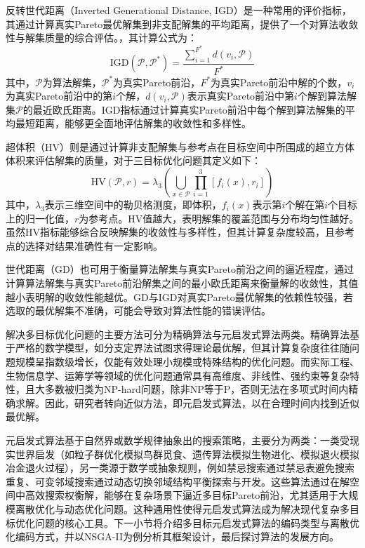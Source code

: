 反转世代距离（Inverted Generational Distance, IGD）是一种常用的评价指标，其通过计算真实Pareto最优解集到非支配解集的平均距离，提供了一个对算法收敛性与解集质量的综合评估。，其计算公式为：
\begin{equation}
    \text{IGD}(\mathcal{P}, \mathcal{P}^*) = \frac{\sum_{i=1}^{F^*} d(v_i, \mathcal{P})}{F^*}
\end{equation}
其中，\(\mathcal{P}\)为算法解集，\(\mathcal{P}^*\)为真实Pareto前沿，\(F^*\)为真实Pareto前沿中解的个数，\(v_i\)为真实Pareto前沿中的第\(i\)个解，\(d(v_i, \mathcal{P})\)表示真实Pareto前沿中第\(i\)个解到算法解集\(\mathcal{P}\)的最近欧氏距离。IGD指标通过计算真实Pareto前沿中每个解到算法解集的平均最短距离，能够更全面地评估解集的收敛性和多样性。

超体积（HV）则是通过计算非支配解集与参考点在目标空间中所围成的超立方体体积来评估解集的质量，对于三目标优化问题其定义如下：
\begin{equation}
    \text{HV}(\mathcal{P}, r) = \lambda_3 \left( \bigcup_{x\in \mathcal{P}} \prod_{i=1}^{3} [f_i(x), r_i] \right)
\end{equation}
其中，\(\lambda_3\)表示三维空间中的勒贝格测度，即体积，\(f_i(x)\)表示第\(i\)个解在第\(i\)个目标上的归一化值，\(r\)为参考点。HV值越大，表明解集的覆盖范围与分布均匀性越好。虽然HV指标能够综合反映解集的收敛性与多样性，但其计算复杂度较高，且参考点的选择对结果准确性有一定影响。

世代距离（GD）也可用于衡量算法解集与真实Pareto前沿之间的逼近程度，通过计算算法解集与真实Pareto前沿解集之间的最小欧氏距离来衡量解的收敛性，其值越小表明解的收敛性能越优。GD与IGD对真实Pareto最优解集的依赖性较强，若选取的最优解集不准确，可能会导致对算法性能的错误评估。

解决多目标优化问题的主要方法可分为精确算法与元启发式算法两类。精确算法基于严格的数学模型，如分支定界法试图求得理论最优解，但其计算复杂度往往随问题规模呈指数级增长，仅能有效处理小规模或特殊结构的优化问题。而实际工程、生物信息学、运筹学等领域的优化问题通常具有高维度、非线性、强约束等复杂特性，且大多数被归类为NP-hard问题，除非NP等于P，否则无法在多项式时间内精确求解。因此，研究者转向近似方法，即元启发式算法，以在合理时间内找到近似最优解。

元启发式算法基于自然界或数学规律抽象出的搜索策略，主要分为两类：一类受现实世界启发（如粒子群优化模拟鸟群觅食、遗传算法模拟生物进化、模拟退火模拟冶金退火过程），另一类源于数学或抽象规则，例如禁忌搜索通过禁忌表避免搜索重复、可变邻域搜索通过动态切换邻域结构平衡探索与开发。这些算法通过在解空间中高效搜索权衡解，能够在复杂场景下逼近多目标Pareto前沿，尤其适用于大规模离散优化与动态优化问题\cite{abdel-bassetChapter10Metaheuristic2018}。这种通用性使得元启发式算法成为解决现代复杂多目标优化问题的核心工具。下一小节将介绍多目标元启发式算法的编码类型与离散优化编码方式，并以NSGA-II为例分析其框架设计，最后探讨算法的发展方向。

